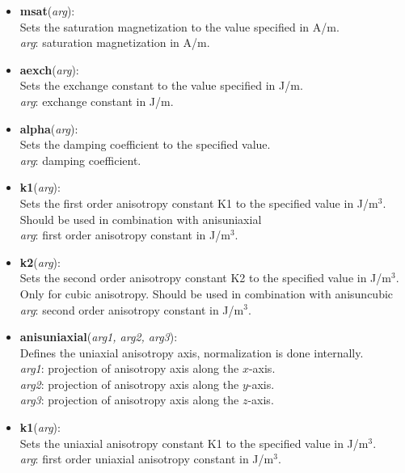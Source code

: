 \begin{itemize}
 \item \textbf{msat}(\textit{arg}):\\
				Sets the saturation magnetization to the value specified in A/m.\\
				\textit{arg}: saturation magnetization in A/m.
 
 \item \textbf{aexch}(\textit{arg}):\\
				Sets the exchange constant to the value specified in J/m.\\
				\textit{arg}: exchange constant in J/m.

 \item \textbf{alpha}(\textit{arg}):\\
				Sets the damping coefficient to the specified value.\\
				\textit{arg}: damping coefficient.

 \item \textbf{k1}(\textit{arg}):\\
				Sets the first order anisotropy constant K1 to the specified value in J/m$^3$.  Should be used in combination with anisuniaxial\\
				\textit{arg}: first order anisotropy constant in J/m$^3$.

 \item \textbf{k2}(\textit{arg}):\\
				Sets the second order anisotropy constant K2 to the specified value in J/m$^3$.  Only for cubic anisotropy.  Should be used in combination with \textrm{anisuncubic}\\
				\textit{arg}: second order anisotropy constant in J/m$^3$.

 \item \textbf{anisuniaxial}(\textit{arg1, arg2, arg3}):\\
				Defines the uniaxial anisotropy axis, normalization is done internally.\\
				\textit{arg1}: projection of anisotropy axis along the $x$-axis.\\
				\textit{arg2}: projection of anisotropy axis along the $y$-axis.\\
				\textit{arg3}: projection of anisotropy axis along the $z$-axis.

 \item \textbf{k1}(\textit{arg}):\\
				Sets the uniaxial anisotropy constant K1 to the specified value in J/m$^3$.\\
				\textit{arg}: first order uniaxial anisotropy constant in J/m$^3$.

\end{itemize}

